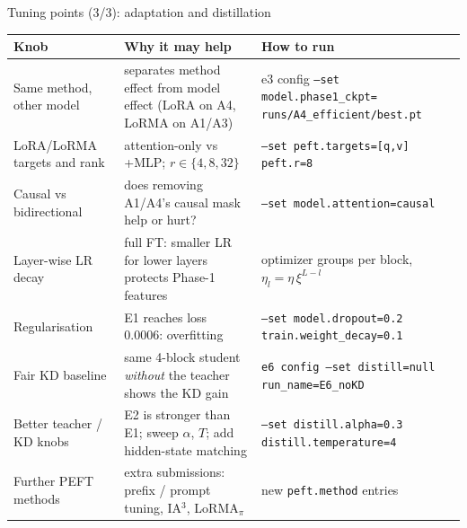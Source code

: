 \documentclass[aspectratio=169,11pt]{beamer}
\newcommand{\code}[1]{\texttt{\small #1}}
\begin{document}
\begin{frame}{Tuning points (3/3): adaptation and distillation}
  \footnotesize
  \begin{tabularx}{\textwidth}{@{}>{\raggedright\arraybackslash}p{3.0cm}>{\raggedright\arraybackslash}X>{\raggedright\arraybackslash}p{5.6cm}@{}}
    \toprule
    Knob & Why it may help & How to run \\
    \midrule
    Same method, other model & separates method effect from model effect (LoRA on A4, LoRMA on A1/A3) &
      e3 config \code{--set model.phase1\_ckpt=} \code{runs/A4\_efficient/best.pt} \\
    LoRA/LoRMA targets and rank & attention-only vs +MLP; $r \in \{4, 8, 32\}$ &
      \code{--set peft.targets=[q,v] peft.r=8} \\
    Causal vs bidirectional & does removing A1/A4's causal mask help or hurt? &
      \code{--set model.attention=causal} \\
    Layer-wise LR decay & full FT: smaller LR for lower layers protects Phase-1 features & optimizer groups per block, $\eta_l = \eta\,\xi^{L-l}$ \\
    Regularisation & E1 reaches loss 0.0006: overfitting & \code{--set model.dropout=0.2 train.weight\_decay=0.1} \\
    Fair KD baseline & same 4-block student \emph{without} the teacher shows the KD gain &
      \code{e6 config --set distill=null run\_name=E6\_noKD} \\
    Better teacher / KD knobs & E2 is stronger than E1; sweep $\alpha$, $T$; add hidden-state matching &
      \code{--set distill.alpha=0.3 distill.temperature=4} \\
    Further PEFT methods & extra submissions: prefix / prompt tuning, IA$^3$, LoRMA$_\pi$ & new \code{peft.method} entries \\
    \bottomrule
  \end{tabularx}
\end{frame}
\end{document}
